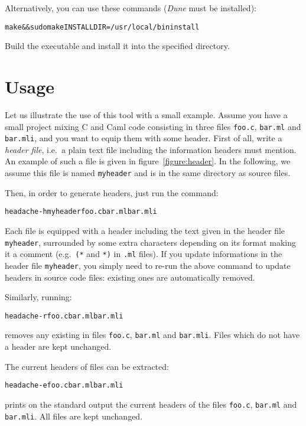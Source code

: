 \documentclass{article}
\newcommand{\mytt}[1]{\texttt{#1}}
\begin{document}
Alternatively, you can use these commands (\emph{Dune} must be installed):

\begin{alltt}
  make && sudo make INSTALLDIR=/usr/local/bin install
\end{alltt}
Build the executable and install it into the specified directory.

\section{Usage}

Let us illustrate the use of this tool with a small example.  Assume
you have a small project mixing C and Caml code consisting in three
files \mytt{foo.c}, \mytt{bar.ml} and \mytt{bar.mli}, and you want to
equip them with some header.  First of all, write a \emph{header
  file}, i.e.\ a plain text file including the information headers
must mention.  An example of such a file is given in
figure~\ref{figure:header}.  In the following, we assume this file is
named \mytt{myheader} and is in the same directory as source files.

Then, in order to generate headers, just run the command:
\begin{alltt}
  headache -h myheader foo.c bar.ml bar.mli
\end{alltt}
Each file is equipped with a header including the text given in the
header file \mytt{myheader}, surrounded by some extra characters
depending on its format making it a comment (e.g.\ \mytt{(*} and
\mytt{*)} in \mytt{.ml} files).  If you update informations in the
header file \mytt{myheader}, you simply need to re-run the above
command to update headers in source code files: existing ones are
automatically removed.

Similarly, running:
\begin{alltt}
  headache -r foo.c bar.ml bar.mli
\end{alltt}
removes any existing in files \mytt{foo.c}, \mytt{bar.ml} and
\mytt{bar.mli}.  Files which do not have a header are kept unchanged.

The current headers of files can be extracted:
\begin{alltt}
  headache -e foo.c bar.ml bar.mli
\end{alltt}
prints on the standard output the current headers of the files \mytt{foo.c},
\mytt{bar.ml} and \mytt{bar.mli}. All files are kept unchanged.
\end{document}
